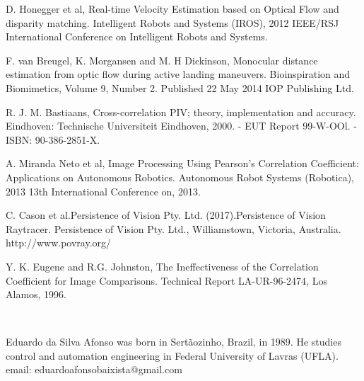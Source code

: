 \documentclass[letterpaper, 10 pt,conference]{ieeeconf}  %
\begin{document}
\begin{thebibliography}{99}

         D. Honegger et al, Real-time Velocity Estimation based on Optical Flow and disparity matching.
         Intelligent Robots and Systems (IROS), 2012 IEEE/RSJ International Conference on Intelligent Robots and Systems.
        
         F. van Breugel, K. Morgansen and M. H Dickinson, Monocular distance estimation from optic flow during
        active landing maneuvers. Bioinspiration and Biomimetics, Volume 9, Number 2. Published 22 May 2014 IOP Publishing Ltd.


	 R. J. M. Bastiaans, Cross-correlation PIV; theory, implementation and accuracy. 
        Eindhoven: Technische Universiteit Eindhoven, 2000. - EUT Report 99-W-OOl. - ISBN: 90-386-2851-X.

         A. Miranda Neto et al, Image Processing Using Pearson's Correlation Coefficient: 
        Applications on Autonomous Robotics. 
        Autonomous Robot Systems (Robotica), 2013 13th International Conference on, 2013.
        
          C. Cason et al.Persistence of Vision Pty. Ltd. (2017).Persistence of Vision Raytracer.
	Persistence of Vision Pty. Ltd., Williamstown, Victoria, Australia. http://www.povray.org/
	
	 Y. K. Eugene and R.G. Johnston, The Ineffectiveness of the Correlation Coefficient for Image Comparisons.
        Technical Report LA-UR-96-2474, Los Alamos, 1996.
	
	
        

	

        
        
	
\end{thebibliography}
~\\
\begin{biography}{Eduardo da Silva Afonso}
was born in Sertãozinho, Brazil, in 1989. He studies control and automation engineering in Federal University of Lavras (UFLA).
email: eduardoafonsobaixista@gmail.com
\end{biography}
\end{document}
